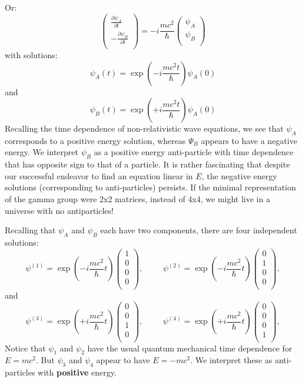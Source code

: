 \documentclass[12pt]{book}
\begin{document}
Or:
$$
\begin{pmatrix} 
\displaystyle \frac{\partial \psi_A}{\partial t}\\[10pt]
\displaystyle -\frac{\partial \psi_B}{\partial t}\\[10pt]
\end{pmatrix}
=
-i \frac{mc^2}{\hbar}
\begin{pmatrix} 
\psi_A\\
\psi_B\\
\end{pmatrix}
$$
with solutions:
$$\psi_A(t) = \exp\left( -i\frac{mc^2t}{\hbar}\right) \psi_A(0)$$
and 
$$\psi_B(t) = \exp\left( +i\frac{mc^2t}{\hbar}\right) \psi_A(0)$$
Recalling the time dependence of non-relativistic wave equations, we see that $\psi_A$ corresponds to a positive energy solution, whereas $\Psi_B$ appears to have a negative energy.  We interpret $\psi_B$ as a positive energy anti-particle with time dependence that has opposite sign to that of a particle.  It is rather fascinating that despite our successful endeavor to find an equation linear in $E$, the negative energy solutions (corresponding to anti-particles) persists.  If the minimal representation of the gamma group were 2x2 matrices, instead of 4x4, we might live in a universe with no antiparticles!

Recalling that $\psi_A$ and $\psi_B$ each have two components, there are four independent solutions:
$$
\psi^{(1)} = \exp\left(- i \frac{mc^2}{\hbar} t\right)
\begin{pmatrix} 
1\\
0\\
0\\
0\\
\end{pmatrix},
\hspace{1cm}
\psi^{(2)} = \exp\left(- i \frac{mc^2}{\hbar} t\right)
\begin{pmatrix} 
0\\
1\\
0\\
0\\
\end{pmatrix},
$$
and
$$
\psi^{(3)} = \exp\left(+ i \frac{mc^2}{\hbar} t\right)
\begin{pmatrix} 
0\\
0\\
1\\
0\\
\end{pmatrix},
\hspace{1cm}
\psi^{(4)} = \exp\left(+ i \frac{mc^2}{\hbar} t\right)
\begin{pmatrix} 
0\\
0\\
0\\
1\\
\end{pmatrix},
$$
Notice that $\psi_1$ and $\psi_2$ have the usual quantum mechanical time dependence for $E=mc^2$.  But $\psi_3$ and $\psi_4$ appear to have $E=-mc^2$.  We interpret these as anti-particles with {\bf positive} energy.
\end{document}

